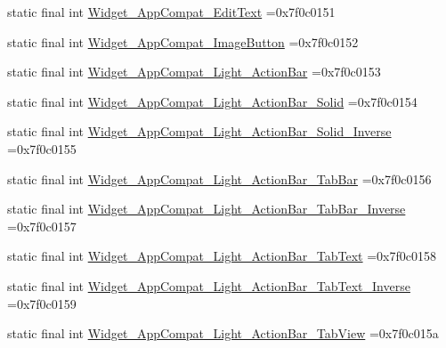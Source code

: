 \begin{DoxyCompactItemize}
\item 
static final int \mbox{\hyperlink{classbr_1_1unb_1_1cic_1_1mp_1_1marketmaster_1_1test_1_1R_1_1style_a5bf715f4973d6655274802b02892c0ce}{Widget\+\_\+\+App\+Compat\+\_\+\+Edit\+Text}} =0x7f0c0151
\item 
static final int \mbox{\hyperlink{classbr_1_1unb_1_1cic_1_1mp_1_1marketmaster_1_1test_1_1R_1_1style_a36ddf70723bee5d28316fe559f73f2c6}{Widget\+\_\+\+App\+Compat\+\_\+\+Image\+Button}} =0x7f0c0152
\item 
static final int \mbox{\hyperlink{classbr_1_1unb_1_1cic_1_1mp_1_1marketmaster_1_1test_1_1R_1_1style_a44aa9d0451008d983525f3f8db4d0099}{Widget\+\_\+\+App\+Compat\+\_\+\+Light\+\_\+\+Action\+Bar}} =0x7f0c0153
\item 
static final int \mbox{\hyperlink{classbr_1_1unb_1_1cic_1_1mp_1_1marketmaster_1_1test_1_1R_1_1style_a278f34bbc9d9009d65c1c81b40d1999c}{Widget\+\_\+\+App\+Compat\+\_\+\+Light\+\_\+\+Action\+Bar\+\_\+\+Solid}} =0x7f0c0154
\item 
static final int \mbox{\hyperlink{classbr_1_1unb_1_1cic_1_1mp_1_1marketmaster_1_1test_1_1R_1_1style_a8f0779c484a2adbd7c884a841a31c199}{Widget\+\_\+\+App\+Compat\+\_\+\+Light\+\_\+\+Action\+Bar\+\_\+\+Solid\+\_\+\+Inverse}} =0x7f0c0155
\item 
static final int \mbox{\hyperlink{classbr_1_1unb_1_1cic_1_1mp_1_1marketmaster_1_1test_1_1R_1_1style_abc3d1cd16a2d27fea15215b909d5f169}{Widget\+\_\+\+App\+Compat\+\_\+\+Light\+\_\+\+Action\+Bar\+\_\+\+Tab\+Bar}} =0x7f0c0156
\item 
static final int \mbox{\hyperlink{classbr_1_1unb_1_1cic_1_1mp_1_1marketmaster_1_1test_1_1R_1_1style_a7a74a0274b0daa3e13163125802bb0ba}{Widget\+\_\+\+App\+Compat\+\_\+\+Light\+\_\+\+Action\+Bar\+\_\+\+Tab\+Bar\+\_\+\+Inverse}} =0x7f0c0157
\item 
static final int \mbox{\hyperlink{classbr_1_1unb_1_1cic_1_1mp_1_1marketmaster_1_1test_1_1R_1_1style_adcc2909ae839999975aa4f080781f074}{Widget\+\_\+\+App\+Compat\+\_\+\+Light\+\_\+\+Action\+Bar\+\_\+\+Tab\+Text}} =0x7f0c0158
\item 
static final int \mbox{\hyperlink{classbr_1_1unb_1_1cic_1_1mp_1_1marketmaster_1_1test_1_1R_1_1style_ac122f0e8142f4d1e85c122da7a5cdcdc}{Widget\+\_\+\+App\+Compat\+\_\+\+Light\+\_\+\+Action\+Bar\+\_\+\+Tab\+Text\+\_\+\+Inverse}} =0x7f0c0159
\item 
static final int \mbox{\hyperlink{classbr_1_1unb_1_1cic_1_1mp_1_1marketmaster_1_1test_1_1R_1_1style_a7761feda2715b80af729c3f3c5d3bd06}{Widget\+\_\+\+App\+Compat\+\_\+\+Light\+\_\+\+Action\+Bar\+\_\+\+Tab\+View}} =0x7f0c015a

\end{DoxyCompactItemize}
